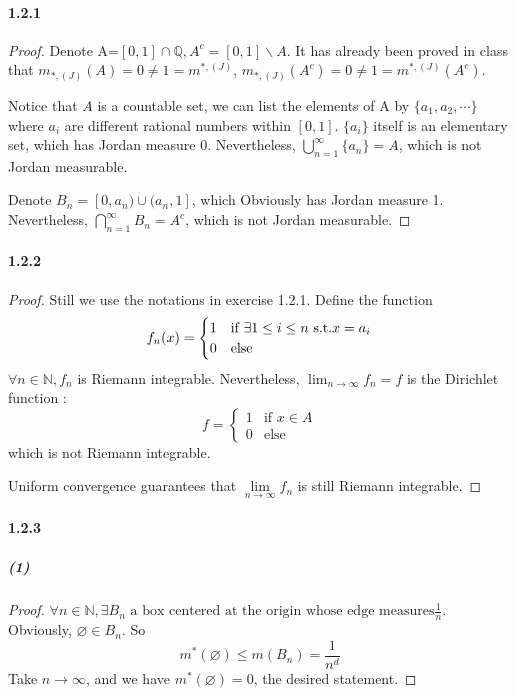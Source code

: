\documentclass{article}
\begin{document}
\paragraph{1.2.1}
\begin{proof}
Denote A=$[0,1]\cap \mathbb{Q},A^c=[0,1]\backslash A$. It has already been proved in class that $m_{*,(J)}(A)=0\neq 1=m^{*,(J)}$, $m_{*,(J)}(A^c)=0\neq 1=m^{*,(J)}(A^c)$. 

Notice that $A$ is a countable set, we can list the elements of A by $\{a_1, a_2,\cdots\}$ where $a_i$ are different rational numbers within $[0,1]$. $\{a_i\}$ itself is an elementary set, which has Jordan measure $0$. Nevertheless, $\bigcup\limits_{n=1}^{\infty}\{a_n\}=A$, which is not Jordan measurable.

Denote $B_n=[0,a_n)\cup (a_n,1]$, which Obviously has Jordan measure 1. Nevertheless, $\bigcap_{n=1}^{\infty}B_n=A^c$, which is not Jordan measurable.
\end{proof}

\paragraph{1.2.2}
\begin{proof}
Still we use the notations in exercise 1.2.1.
Define the function
\[f_n(x)=
\begin{cases}
1 &\text{if } \exists 1\leq i\leq n \text{ s.t.} x=a_i\\  
0 &\text{else}
\end{cases}\]
$\forall n\in\mathbb{N},f_n$ is Riemann integrable. Nevertheless, $\lim_{n\to\infty}f_n=f$ is the Dirichlet function :
\[f=
\begin{cases}
1 &\text{if } x\in A\\
0 &\text{else}
\end{cases}
\]
which is not Riemann integrable.

Uniform convergence guarantees that $\lim\limits_{n\to\infty}f_n$ is still Riemann integrable.
\end{proof}

\paragraph{1.2.3}
\subparagraph{(1)}
\begin{proof}
$\forall n\in\mathbb{N}, \exists B_n\text{ a box centered at the origin whose edge measures} \frac 1 n$. Obviously, $\varnothing\in B_n$. So
\[m^*(\varnothing)\leq m(B_n)=\frac{1}{n^d}\]
Take $n\to\infty$, and we have $m^*(\varnothing)=0$, the desired statement.
\end{proof}
\end{document}
